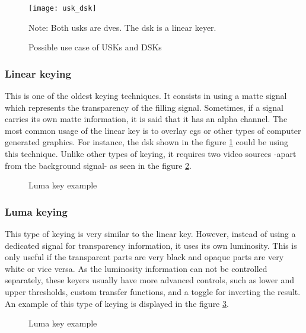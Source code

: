 \documentclass[../main.tex]{subfiles}
\begin{document}
\begin{figure}[hbtp]
    \centering
    \texttt{[image: usk\_dsk]}

    Note: Both \glspl{usk} are \glspl{dve}. The \gls{dsk} is a linear keyer.
    \caption{Possible use case of USKs and DSKs}
    \label{fig:usk_dsk_example}
\end{figure}


\subsubsection{Linear keying}
This is one of the oldest keying techniques. It consists in using a matte signal which represents the transparency of the filling signal. Sometimes, if a signal carries its own matte information, it is said that it has an alpha channel. The most common usage of the linear key is to overlay \glspl{cg} or other types of computer generated graphics. For instance, the \gls{dsk} shown in the figure \ref{fig:usk_dsk_example} could be using this technique. Unlike other types of keying, it requires two video sources -apart from the background signal- as seen in the figure \ref{fig:linear_key_example}.

\begin{figure}[hbtp]
    \centering

    \caption{Luma key example}
    \label{fig:linear_key_example}
\end{figure}

\subsubsection{Luma keying}
This type of keying is very similar to the linear key. However, instead of using a dedicated signal for transparency information, it uses its own luminosity. This is only useful if the transparent parts are very black and opaque parts are very white or vice versa. As the luminosity information can not be controlled separately, these keyers usually have more advanced controls, such as lower and upper thresholds, custom transfer functions, and a toggle for inverting the result. An example of this type of keying is displayed in the figure \ref{fig:luma_key_example}.

\begin{figure}[hbtp]
    \centering

    \caption{Luma key example}
    \label{fig:luma_key_example}
\end{figure}
\end{document}
